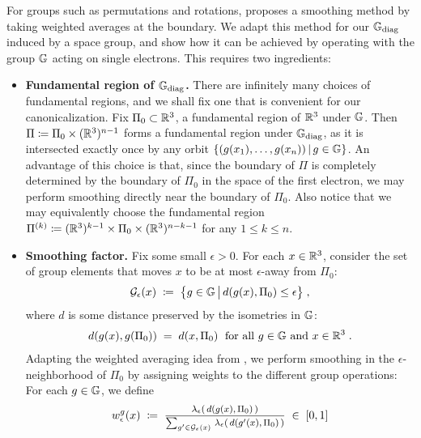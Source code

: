 \vspace{.5em}

For groups such as permutations and rotations, \citet*{dym2024equivariant} proposes a smoothing method by taking weighted averages at the boundary. We adapt this method for our $\mathbb{G}_{\text{\rm diag}}$ induced by a space group, and show how it can be achieved by operating with the group $\mathbb{G}$ acting on single electrons. This requires two ingredients:

\begin{itemize}
    \item \textbf{Fundamental region of $\mathbb{G}_{\text{\rm diag}}$.} There are infinitely many choices of fundamental regions, and we shall fix one that is convenient for our canonicalization. Fix $\Pi_0 \subset \mathbb{R}^3$, a fundamental region of $\mathbb{R}^3$ under $\mathbb{G}$. Then $\Pi \coloneqq \Pi_0 \times (\mathbb{R}^3)^{n-1}$ forms a fundamental region under $\mathbb{G}_{\text{\rm diag}}$, as it is intersected exactly once by any orbit $\{ (g(x_1), \ldots, g(x_n)) \,|\, g\in \mathbb{G}\}$. An advantage of this choice is that, since the boundary of $\Pi $ is completely determined by the boundary of $\Pi_0$ in the space of the first electron, we may perform smoothing directly near the boundary of $\Pi_0$. Also notice that we may equivalently choose the fundamental region $\Pi^{(k)} \coloneqq (\mathbb{R}^3)^{k-1} \times \Pi_0 \times (\mathbb{R}^3)^{n-k-1}$ for any $1 \leq k \leq n$.
    \item \textbf{Smoothing factor.} Fix some small $\epsilon > 0$. For each $x \in \mathbb{R}^3$, consider the set of group elements that moves $x$ to be at most $\epsilon$-away from $\Pi_0$:
    \begin{align*}
        \mathcal{G}_\epsilon(x) 
        \;\coloneqq\;
        \big\{ g \in \mathbb{G} \,\big|\, d( g(x), \Pi_0) \leq \epsilon \big\}
        \;,
    \end{align*}
    where $d$ is some distance preserved by the isometries in $\mathbb{G}$:
    \begin{align*}
        d( g(x), g(\Pi_0) ) \;=\; d( x, \Pi_0 )
        \; \text{ for all } g \in \mathbb{G} \text{ and } x \in \mathbb{R}^3\;.
    \end{align*}
    Adapting the weighted averaging idea from \citet{dym2024equivariant}, we perform smoothing in the $\epsilon$-neighborhood of $\Pi_0$ by assigning weights to the different group operations: For each $g \in \mathbb{G}$, we define 
    \begin{align*}
        w^g_\epsilon(x) \;\coloneqq\; \mfrac{ \lambda_\epsilon( \, d(g(x), \Pi_0) \,  )}{\sum_{g' \in \cG_\epsilon(x)} \, \lambda_\epsilon( \, d(g'(x), \Pi_0) \,)  }
        \;\in\; [0,1]

\end{align*}
\end{itemize}
